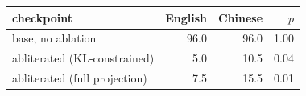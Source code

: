 \begin{tabular}{@{}l r r r@{}}
\toprule
checkpoint & English & Chinese & $p$ \\
\midrule
base, no ablation & 96.0 & 96.0 & 1.00 \\
abliterated (KL-constrained) & 5.0 & 10.5 & 0.04 \\
abliterated (full projection) & 7.5 & 15.5 & 0.01 \\
\bottomrule
\end{tabular}
